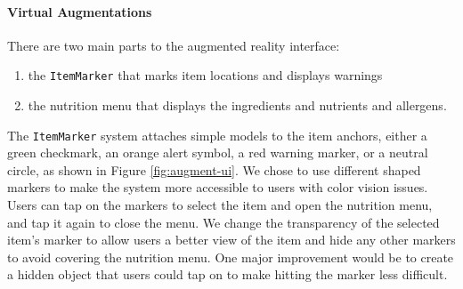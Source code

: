 \documentclass[thesis]{fputhesis}
\begin{document}
\begin{body}
\paragraph{Virtual Augmentations}
There are two main parts to the augmented reality interface: 
\begin{enumerate}
    \item the \verb|ItemMarker| that marks item locations and displays warnings
    \item  the nutrition menu that displays the ingredients and nutrients and allergens.
\end{enumerate}
The \verb|ItemMarker| system attaches simple models to the item anchors, either a green checkmark, an orange alert symbol, a red warning marker, or a neutral circle, as shown in Figure \ref{fig:augment-ui}. We chose to use different shaped markers to make the system more accessible to users with color vision issues. Users can tap on the markers to select the item and open the nutrition menu, and tap it again to close the menu. We change the transparency of the selected item's marker to allow users a better view of the item and hide any other markers to avoid covering the nutrition menu. One major improvement would be to create a hidden object that users could tap on to make hitting the marker less difficult. %



\end{body}
\end{document}
